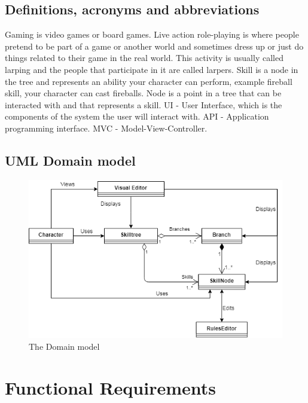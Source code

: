 \documentclass[12pt]{article}
\begin{document}
    \subsection{Definitions, acronyms and abbreviations}
    Gaming is video games or board games.\newline
    Live action role-playing is where people pretend to be part of a game or another world and sometimes dress up or just do things related to their game in the real world. This activity is usually called larping and the people that participate in it are called larpers.\newline
    Skill is a node in the tree and represents an ability your character can perform, example fireball skill, your character can cast fireballs.\newline
    Node is a point in a tree that can be interacted with and that represents a skill.\newline
    UI - User Interface, which is the components of the system the user will interact with.\newline
    API - Application programming interface.\newline
    MVC - Model-View-Controller. \newline
    \subsection{UML Domain model}
    
  \begin{figure}[H]
    \includegraphics[width=\linewidth]{images/TriiDomainModel.png}
    \caption{The Domain model}
    \label{fig:Domainmodel}
  \end{figure}
    
  \section{Functional Requirements}
\end{document}
